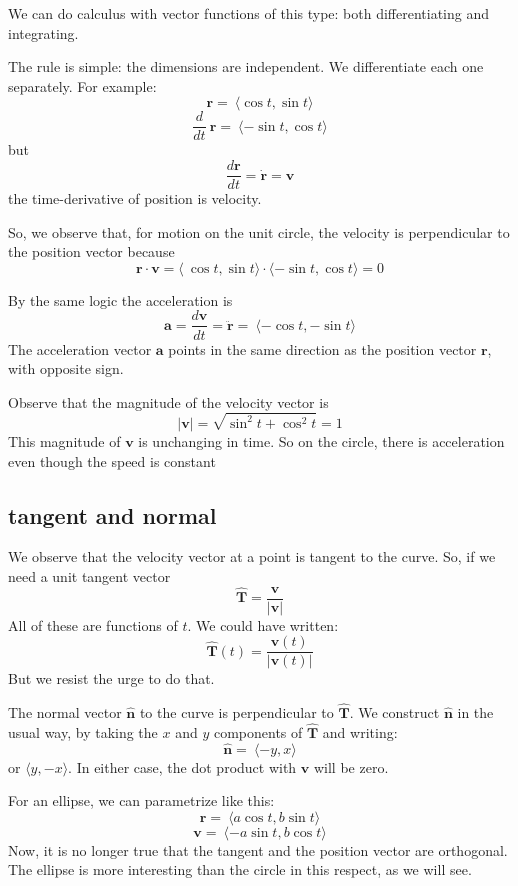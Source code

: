 \documentclass[11pt, oneside]{article}
\begin{document}
We can do calculus with vector functions of this type:  both differentiating and integrating.

The rule is simple:  the dimensions are independent.  We differentiate each one separately.  For example:
\[ \mathbf{r} =  \ \langle \cos t, \sin t \rangle \]
\[ \frac{d}{dt} \ \mathbf{r} =  \ \langle - \sin t, \cos t \rangle \]
but
\[ \frac{d \mathbf{r}}{dt} = \mathbf{\dot{r}} = \mathbf{v} \]
the time-derivative of position is velocity.

So, we observe that, for motion on the unit circle, the velocity is perpendicular to the position vector because
\[ \mathbf{r} \cdot \mathbf{v} =  \langle \ \cos t, \sin t \rangle \cdot \langle -\sin t, \cos t \rangle = 0 \]

By the same logic the acceleration is
\[ \mathbf{a} = \frac{d \mathbf{v}}{dt} = \mathbf{\ddot{r}} = \ \langle -\cos t, -\sin t \rangle  \]
The acceleration vector $\mathbf{a}$ points in the same direction as the position vector $\mathbf{r}$, with opposite sign.

Observe that the magnitude of the velocity vector is
\[ |\mathbf{v}| = \sqrt{\sin^2 t + \cos^2 t} = 1 \]
This magnitude of $\mathbf{v}$ is unchanging in time.  So on the circle, there is acceleration even though the speed is constant

\subsection*{tangent and normal}

We observe that the velocity vector at a point  is tangent to the curve.  So, if we need a unit tangent vector
\[ \mathbf{\hat{T}} = \frac{\mathbf{v}}{|\mathbf{v}|} \]
All of these are functions of $t$.  We could have written:
\[ \mathbf{\hat{T}}(t) = \frac{\mathbf{v}(t)}{|\mathbf{v}(t) |} \]
But we resist the urge to do that.

The normal vector $\mathbf{\hat{n}}$ to the curve is perpendicular to $\mathbf{\hat{T}}$.  We construct $\mathbf{\hat{n}}$ in the usual way, by taking the $x$ and $y$ components of $\mathbf{\hat{T}}$ and writing:
\[ \mathbf{\hat{n}} = \ \langle - y, x \rangle \]
or $\langle y, -x \rangle$.  In either case, the dot product with $\mathbf{v}$ will be zero.

For an ellipse, we can parametrize like this:
\[ \mathbf{r} = \ \langle a \cos t, b \sin t \rangle \]
\[ \mathbf{v} = \ \langle -a \sin t, b \cos t \rangle \]
Now, it is no longer true that the tangent and the position vector are orthogonal.  The ellipse is more interesting than the circle in this respect, as we will see.
\end{document}
